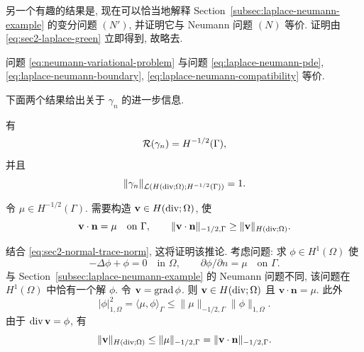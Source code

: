 另一个有趣的结果是, 现在可以恰当地解释
Section~\ref{subsec:laplace-neumann-example} 的变分问题 $(N')$,
并证明它与 Neumann 问题 $(N)$ 等价. 证明由 \eqref{eq:sec2-laplace-green} 立即得到, 故略去.

\setcounter{statement}{6}
\begin{Corollary}\label{cor:sec2-neumann-equivalence}
问题 \eqref{eq:neumann-variational-problem} 与问题
\eqref{eq:laplace-neumann-pde},
\eqref{eq:laplace-neumann-boundary},
\eqref{eq:laplace-neumann-compatibility} 等价.
\end{Corollary}

下面两个结果给出关于 $\gamma_n$ 的进一步信息.

\setcounter{statement}{7}
\begin{Corollary}\label{cor:sec2-normal-trace-surjective}
有
\[
  \mathcal{R}(\gamma_n)=H^{-1/2}(\Gamma),
\]
并且
\[
  \|\gamma_n\|_{\mathcal{L}(H(\operatorname{div};\Omega);H^{-1/2}(\Gamma))}=1.
\]
\end{Corollary}
\begin{Proof}
令 $\mu\in H^{-1/2}(\Gamma)$. 需要构造 $\mathbf v\in H(\operatorname{div};\Omega)$, 使
\[
  \mathbf v\cdot\mathbf n=\mu\quad\text{on }\Gamma,
  \qquad \|\mathbf v\cdot\mathbf n\|_{-1/2,\Gamma}
  \ge\|\mathbf v\|_{H(\operatorname{div};\Omega)}.
\]

结合 \eqref{eq:sec2-normal-trace-norm}, 这将证明该推论. 考虑问题: 求
$\phi\in H^1(\Omega)$ 使
\[
  -\Delta\phi+\phi=0\quad\text{in }\Omega,
  \qquad \partial\phi/\partial n=\mu\quad\text{on }\Gamma.
\]
与 Section~\ref{subsec:laplace-neumann-example} 的 Neumann 问题不同,
该问题在 $H^1(\Omega)$ 中恰有一个解 $\phi$. 令 $\mathbf v=\operatorname{grad}\phi$. 则
$\mathbf v\in H(\operatorname{div};\Omega)$ 且 $\mathbf v\cdot\mathbf n=\mu$. 此外
\[
  |\phi|_{1,\Omega}^2=\langle\mu,\phi\rangle_\Gamma
  \le\|\mu\|_{-1/2,\Gamma}\|\phi\|_{1,\Omega}.
\]
由于 $\operatorname{div}\mathbf v=\phi$, 有
\[
  \|\mathbf v\|_{H(\operatorname{div};\Omega)}
  \le\|\mu\|_{-1/2,\Gamma}
  =\|\mathbf v\cdot\mathbf n\|_{-1/2,\Gamma}.
\]
\end{Proof}

